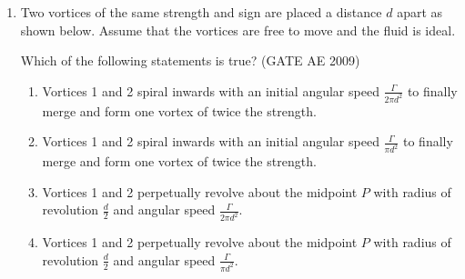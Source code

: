 \documentclass[journal]{IEEEtran}
\begin{document}
\begin{enumerate}
    \item Two vortices of the same strength and sign are placed a distance $d$ apart as shown below. Assume that the vortices are free to move and the fluid is ideal.
    \begin{center}
        
    \end{center}
    Which of the following statements is true?  \hfill (GATE AE 2009)
    \begin{enumerate}
        \item Vortices 1 and 2 spiral inwards with an initial angular speed $\frac{\Gamma}{2\pi d^2}$ to finally merge and form one vortex of twice the strength.
        \item Vortices 1 and 2 spiral inwards with an initial angular speed $\frac{\Gamma}{\pi d^2}$ to finally merge and form one vortex of twice the strength.
        \item Vortices 1 and 2 perpetually revolve about the midpoint $P$ with radius of revolution $\frac{d}{2}$ and angular speed $\frac{\Gamma}{2\pi d^2}$.
        \item Vortices 1 and 2 perpetually revolve about the midpoint $P$ with radius of revolution $\frac{d}{2}$ and angular speed $\frac{\Gamma}{\pi d^2}$.
    \end{enumerate}


\end{enumerate}
\end{document}
